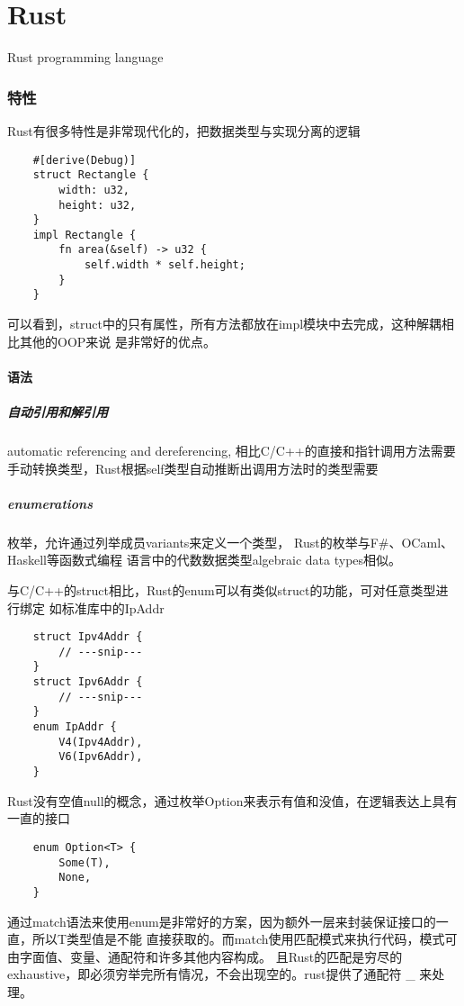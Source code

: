 \clearpage
\part{Rust}

Rust programming language

\section{特性}

Rust有很多特性是非常现代化的，把数据类型与实现分离的逻辑
\begin{lstlisting}
    #[derive(Debug)]
    struct Rectangle {
        width: u32,
        height: u32,
    }
    impl Rectangle {
        fn area(&self) -> u32 {
            self.width * self.height;
        }
    }
\end{lstlisting}
可以看到，struct中的只有属性，所有方法都放在impl模块中去完成，这种解耦相比其他的OOP来说
是非常好的优点。

\subsection{语法}

\subsubsection{自动引用和解引用}
automatic referencing and dereferencing, 
相比C/C++的直接和指针调用方法需要手动转换类型，Rust根据self类型自动推断出调用方法时的类型需要

\subsubsection{enumerations}

枚举，允许通过列举成员variants来定义一个类型， Rust的枚举与F\#、OCaml、Haskell等函数式编程
语言中的代数数据类型algebraic data types相似。

与C/C++的struct相比，Rust的enum可以有类似struct的功能，可对任意类型进行绑定
如标准库中的IpAddr
\begin{lstlisting}
    struct Ipv4Addr {
        // ---snip---
    }
    struct Ipv6Addr {
        // ---snip---
    }
    enum IpAddr {
        V4(Ipv4Addr),
        V6(Ipv6Addr),
    }
\end{lstlisting}

Rust没有空值null的概念，通过枚举Option来表示有值和没值，在逻辑表达上具有一直的接口
\begin{lstlisting}
    enum Option<T> {
        Some(T),
        None,
    }
\end{lstlisting}
通过match语法来使用enum是非常好的方案，因为额外一层来封装保证接口的一直，所以T类型值是不能
直接获取的。而match使用匹配模式来执行代码，模式可由字面值、变量、通配符和许多其他内容构成。
且Rust的匹配是穷尽的exhaustive，即必须穷举完所有情况，不会出现空的。rust提供了通配符 \_ 来处理。


